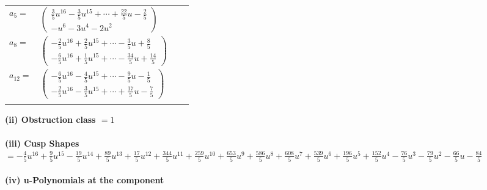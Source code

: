 \documentclass[1p]{elsarticle_modified}
\theoremstyle{definition}
\begin{document}
\begin{tabular}{m{7pt} m{180pt} m{7pt} m{180pt} }
\flushright $a_{5}=$&$\begin{pmatrix}\frac{3}{5} u^{16}-\frac{3}{5} u^{15}+\cdots+\frac{22}{5} u-\frac{2}{5}\\- u^6-3 u^4-2 u^2\end{pmatrix}$ \\
\flushright $a_{8}=$&$\begin{pmatrix}-\frac{2}{5} u^{16}+\frac{2}{5} u^{15}+\cdots-\frac{3}{5} u+\frac{8}{5}\\-\frac{6}{5} u^{16}+\frac{1}{5} u^{15}+\cdots-\frac{34}{5} u+\frac{14}{5}\end{pmatrix}$ \\
\flushright $a_{12}=$&$\begin{pmatrix}-\frac{6}{5} u^{16}-\frac{4}{5} u^{15}+\cdots-\frac{9}{5} u-\frac{1}{5}\\-\frac{2}{5} u^{16}-\frac{3}{5} u^{15}+\cdots+\frac{17}{5} u-\frac{7}{5}\end{pmatrix}$\\&\end{tabular}
\flushleft \textbf{(ii) Obstruction class $= 1$}\\~\\
\flushleft \textbf{(iii) Cusp Shapes $= -\frac{4}{5} u^{16}+\frac{9}{5} u^{15}-\frac{19}{5} u^{14}+\frac{89}{5} u^{13}+\frac{17}{5} u^{12}+\frac{344}{5} u^{11}+\frac{259}{5} u^{10}+\frac{653}{5} u^9+\frac{586}{5} u^8+\frac{608}{5} u^7+\frac{539}{5} u^6+\frac{196}{5} u^5+\frac{152}{5} u^4-\frac{76}{5} u^3-\frac{79}{5} u^2-\frac{66}{5} u-\frac{84}{5}$}\\~\\
\newpage\renewcommand{\arraystretch}{1}
\flushleft \textbf{(iv) u-Polynomials at the component}\newline \\
\end{document}

